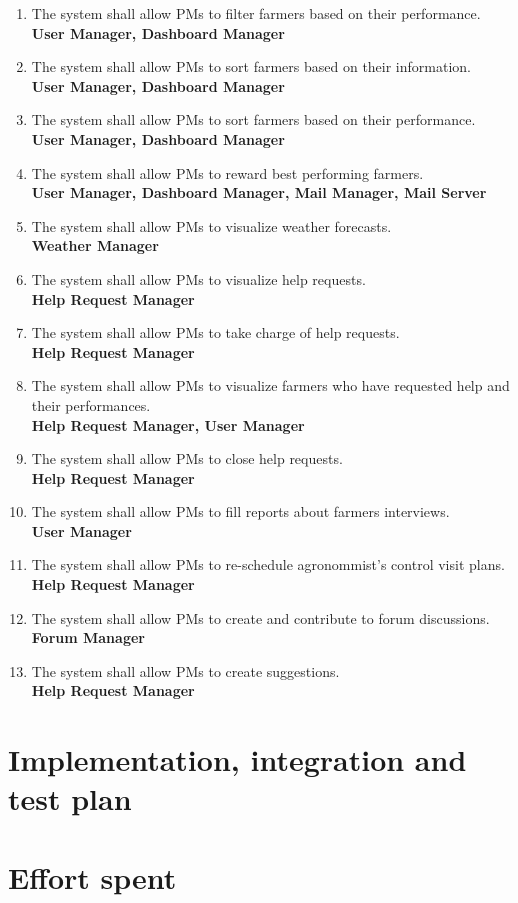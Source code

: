 \documentclass[10pt]{article} %
\begin{document}
\begin{enumerate}[label=\textbf{R\arabic*}]
    \item \label{req:pmFilter2} The system shall allow PMs to filter farmers based on their performance.    
    \\\textbf{User Manager, Dashboard Manager} 
    \item \label{req:pmSort1} The system shall allow PMs to sort farmers based on their information.    
    \\\textbf{User Manager, Dashboard Manager} 
    \item \label{req:pmSort2} The system shall allow PMs to sort farmers based on their performance.     
    \\\textbf{User Manager, Dashboard Manager} 
    \item \label{req:pmRewards} The system shall allow PMs to reward best performing farmers.    
    \\\textbf{User Manager, Dashboard Manager, Mail Manager, Mail Server} 
    \item \label{req:pmWeather} The system shall allow PMs to visualize weather forecasts.    
    \\\textbf{Weather Manager} 
    \item \label{req:pmHelp1} The system shall allow PMs to visualize help requests.
    \\\textbf{Help Request Manager} 
    \item \label{req:pmHelp2} The system shall allow PMs to take charge of help requests.
    \\\textbf{Help Request Manager} 
    \item \label{req:pmHelp3} The system shall allow PMs to visualize farmers who have requested help and their performances.
    \\\textbf{Help Request Manager, User Manager} 
    \item \label{req:pmHelp4} The system shall allow PMs to close help requests.
    \\\textbf{Help Request Manager}
    \item \label{req:pmInterview} The system shall allow PMs to fill reports about farmers interviews.    
    \\\textbf{User Manager}
    \item \label{req:pmVisits} The system shall allow PMs to re-schedule agronommist's control visit plans.    
    \\\textbf{Help Request Manager}
    \item \label{req:pmForum} The system shall allow PMs to create and contribute to forum discussions.    
    \\\textbf{Forum Manager}
    \item \label{req:pmSuggestions} The system shall allow PMs to create suggestions.
    \\\textbf{Help Request Manager}
\end{enumerate}

\section{Implementation, integration and test plan}

\section{Effort spent}


\end{document}
